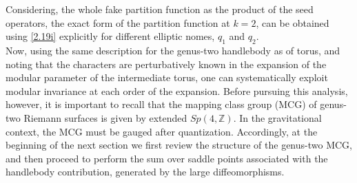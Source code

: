 \documentclass[12 pt]{article}
\begin{document}
\noindent
Considering, the whole fake partition function as the product of the seed operators, the exact form of the partition function at $k=2$, can be obtained using  \eqref{2.19i} explicitly for different elliptic nomes, $q_1$ and $q_2$.
\\Now, using the same description for the genus-two handlebody as of torus, and noting that the characters are perturbatively known in the expansion of the modular parameter  of the intermediate torus, one can systematically exploit modular invariance  at each order of the expansion. Before pursuing this analysis, however, it is
important to recall that the mapping class group (MCG) of genus-two Riemann
surfaces is given by extended $Sp(4,\mathbb{Z})$. In the gravitational context, the  MCG must be gauged after quantization. Accordingly, at the beginning of the next section we first review the structure of the genus-two MCG, and then
proceed to perform the sum over saddle points associated with the handlebody contribution, generated by the large diffeomorphisms.
\end{document}

